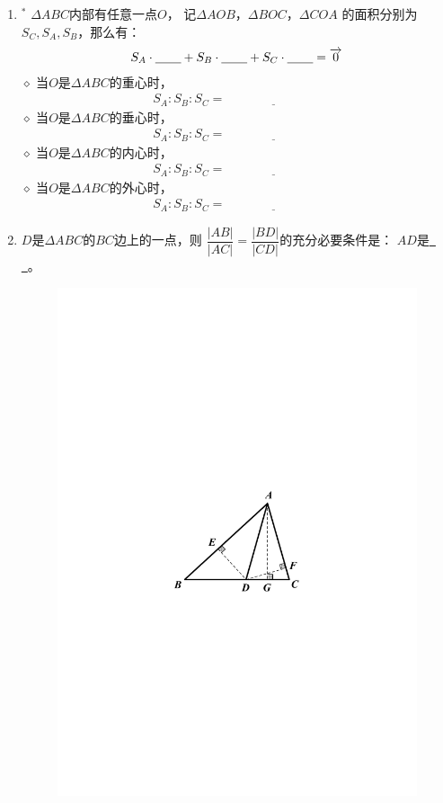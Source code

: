 \documentclass{article}
\newif\ifte
\renewcommand{\vec}{\overrightarrow}
\begin{document}
\begin{multicols}{2}
\begin{enumerate}[leftmargin=20pt]
\item $^*$ $ \Delta ABC $内部有任意一点$ O $，
记$ \Delta AOB $，$ \Delta BOC $，$ \Delta COA $
的面积分别为$ S_C,S_A,S_B $，那么有：
\begin{align*}
    S_A\cdot \underline{\ \ifte \vec{OA}
        \else \hspace{0.5cm} \fi\ }+ 
    S_B\cdot \underline{\ \ifte \vec{OB}
        \else \hspace{0.5cm} \fi\ }+
    S_C\cdot \underline{\ \ifte \vec{OC}
        \else \hspace{0.5cm} \fi\ }= \vec{0}
\end{align*}
$\diamond$ 当$ O $是$ \Delta ABC $的重心时，
\begin{gather*}
    S_A:S_B:S_C=\underline{\ \ifte 1:1:1
        \else \hspace{3cm} \fi\ }
\end{gather*}
$\diamond$ 当$ O $是$ \Delta ABC $的垂心时，
\begin{gather*}
    S_A:S_B:S_C=\underline{\ \ifte \tan A:
    \tan B:\tan C\else \hspace{3cm} \fi\ } 
\end{gather*}
$\diamond$ 当$ O $是$ \Delta ABC $的内心时，
\begin{gather*}
    S_A:S_B:S_C=\underline{\ \ifte a:b:c
        \else \hspace{3cm} \fi\ }
\end{gather*}
$\diamond$ 当$ O $是$ \Delta ABC $的外心时，
\begin{gather*}
    S_A:S_B:S_C=\underline{\ \ifte 
        \sin 2A:\sin 2B:\sin 2C
        \else \hspace{3cm} \fi\ }
\end{gather*}

\item $ D $是$ \Delta ABC $的$ BC $边上的一点，则
$ \dfrac{|AB|}{|AC|}=\dfrac{|BD|}{|CD|} $的充分必要条件是：
$ AD $是\underline{\ \ifte $ \angle BAC $的角平分线
    \else \hspace{4cm} \fi\ }。
\begin{figure}[H]
    \centering
    \includegraphics[width=0.3\linewidth]{三角形的内角平分线定理}
\end{figure}


\end{enumerate}
\end{multicols}
\end{document}
